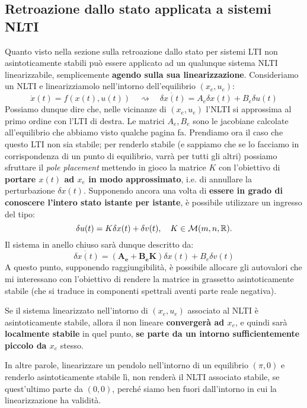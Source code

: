 \documentclass[a4paper]{report}
\begin{document}
\subsection{Retroazione dallo stato applicata a sistemi NLTI}
Quanto visto nella sezione sulla retroazione dallo stato per sistemi LTI non asintoticamente stabili può essere applicato ad un qualunque sistema NLTI linearizzabile, semplicemente \textbf{agendo sulla sua linearizzazione}. Consideriamo un NLTI e linearizziamolo nell'intorno dell'equilibrio $(x_e, u_e)$:
\begin{equation*}
	\dot x(t) = f(x(t), u(t)) \quad \rightsquigarrow \quad \dot{\delta x(t)} = A_e \delta x(t) +B_e \delta u(t)
\end{equation*}
Possiamo dunque dire che, nelle vicinanze di $(x_e, u_e)$ l'NLTI si approssima al primo ordine con l'LTI di destra. Le matrici $A_e, B_e$ sono le jacobiane calcolate all'equilibrio che abbiamo visto qualche pagina fa. Prendiamo ora il caso che questo LTI non sia stabile; per renderlo stabile (e sappiamo che se lo facciamo in corrispondenza di un punto di equilibrio, varrà per tutti gli altri) possiamo sfruttare il \textit{pole placement} mettendo in gioco la matrice $K$ con l'obiettivo di \textbf{portare $x(t)$ ad $x_e$ in modo approssimato}, i.e. di annullare la perturbazione $\delta x(t)$. Supponendo ancora una volta di \textbf{essere in grado di conoscere l'intero stato istante per istante}, è possibile utilizzare un ingresso del tipo:
\begin{equation}
	\delta u(t) = K\delta x(t) + \delta v(t), \quad K \in \mathcal{M}(m,n,\mathbb{R}).
\end{equation}
Il sistema in anello chiuso sarà dunque descritto da:
\begin{equation}
	\dot{\delta x(t)} = (\mathbf{A_e + B_e K})\delta x(t) + B_e \delta v(t)
\end{equation}
A questo punto, supponendo raggiungibilità, è possibile allocare gli autovalori che mi interessano con l'obiettivo di rendere la matrice in grassetto asintoticamente stabile (che si traduce in componenti spettrali aventi parte reale negativa).
\begin{prop}
	Se il sistema linearizzato nell'intorno di $(x_e, u_e)$ associato al NLTI è asintoticamente stabile, allora il non lineare \textbf{convergerà ad $x_e$}, e quindi sarà \textbf{localmente stabile} in quel punto, \textbf{se parte da un intorno sufficientemente piccolo da $x_e$} stesso.
\end{prop} 
In altre parole, linearizzare un pendolo nell'intorno di un equilibrio $(\pi, 0)$ e renderlo asintoticamente stabile lì, non renderà il NLTI associato stabile, se quest'ultimo parte da $(0,0)$, perché siamo ben fuori dall'intorno in cui la linearizzazione ha validità.
\end{document}
